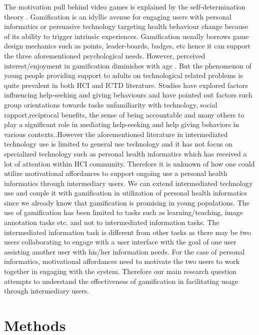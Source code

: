 \documentclass{sig-alternate}
\begin{document}
The motivation pull behind video games is explained by the self-determination theory \cite{ryan2006:motivationalpull}. Gamification is an idyllic avenue for engaging users with personal informatics or persuasive technology targeting health behaviour change because of its ability to trigger intrinsic experiences. Gamification usually borrows game design mechanics such as points, leader-boards, badges, etc hence it can support the three aforementioned psychological needs. However, perceived interest/enjoyment in gamification diminishes with age \cite{v2014motivational}. But the phenomenon of young people providing support to adults on technological related problems is quite prevalent in both HCI and ICTD literature. Studies have explored factors influencing help-seeking and giving behaviours and have pointed out factors such group orientations towards tasks unfamiliarity with technology, social rapport,reciprocal benefits, the sense of being accountable and many others to play a significant role in mediating help-seeking and help giving behaviors in various contexts.\cite{sambasivan2010,poole:chh,kiesler:twi,parikh2006}.However the aforementioned literature in intermediated technology use is limited to general use technology and it has not focus on specialized technology such as personal health informatics which has received a lot of attention within HCI community. Therefore it is unknown of how one could utilize motivational affordances to support ongoing use a personal health informatics through intermediary users.\newline
We can extend intermediated technology use and couple it with gamification in utilization of personal health informatics since we already know that gamification is promising in young populations. The use of gamification has been limited to tasks such as learning/teaching, image annotation tasks etc. and not to intermediated information tasks. The intermediated information task is different from other tasks as there may be two users collaborating to engage with a user interface with the goal of one user assisting another user with his/her information needs. For the case of personal informatics, motivational affordances need to motivate the two users to work together in engaging with the system.\newline  
Therefore our main research question attempts to understand the effectiveness of gamification in facilitating usage through intermediary users.
\section{Methods}
\end{document}
